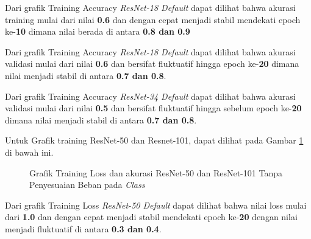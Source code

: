Dari grafik Training Accuracy \emph{ResNet-18 Default} dapat dilihat bahwa akurasi training mulai dari nilai \textbf{0.6} dan dengan cepat menjadi stabil mendekati epoch ke-\textbf{10} dimana nilai berada di antara \textbf{0.8 dan 0.9} 

Dari grafik Training Accuracy \emph{ResNet-18 Default} dapat dilihat bahwa akurasi validasi mulai dari nilai \textbf{0.6} dan bersifat fluktuatif hingga epoch ke-\textbf{20} dimana nilai menjadi stabil di antara \textbf{0.7 dan 0.8}.

Dari grafik Training Accuracy \emph{ResNet-34 Default} dapat dilihat bahwa akurasi validasi mulai dari nilai \textbf{0.5} dan bersifat fluktuatif hingga sebelum epoch ke-\textbf{20} dimana nilai menjadi stabil di antara \textbf{0.7 dan 0.8}.

Untuk Grafik training ResNet-50 dan Resnet-101, dapat dilihat pada Gambar \ref{Fig:GraphTrainingDefPt2} di bawah ini.

\begin{figure}[hbtp]
	\centering
	\qquad
	\caption{Grafik Training Loss dan akurasi ResNet-50 dan ResNet-101 Tanpa Penyesuaian Beban pada \emph{Class}}
	\label{Fig:GraphTrainingDefPt2}
\end{figure}
Dari grafik Training Loss \emph{ResNet-50 Default} dapat dilihat bahwa nilai loss mulai dari \textbf{1.0} dan dengan cepat menjadi stabil mendekati epoch ke-\textbf{20} dengan nilai menjadi fluktuatif di antara \textbf{0.3 dan 0.4}.

